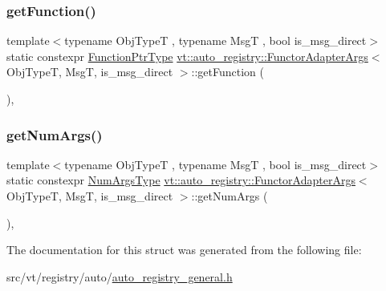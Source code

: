 \subsubsection{\texorpdfstring{get\+Function()}{getFunction()}}
{\footnotesize\ttfamily template$<$typename Obj\+TypeT , typename MsgT , bool is\+\_\+msg\+\_\+direct$>$ \\
static constexpr \hyperlink{structvt_1_1auto__registry_1_1_functor_adapter_args_ae2dba60ea2070d1b36d63bd466abf80e}{Function\+Ptr\+Type} \hyperlink{structvt_1_1auto__registry_1_1_functor_adapter_args}{vt\+::auto\+\_\+registry\+::\+Functor\+Adapter\+Args}$<$ Obj\+TypeT, MsgT, is\+\_\+msg\+\_\+direct $>$\+::get\+Function (\begin{DoxyParamCaption}{ }\end{DoxyParamCaption})\hspace{0.3cm}{\ttfamily [inline]}, {\ttfamily [static]}}

\mbox{\label{structvt_1_1auto__registry_1_1_functor_adapter_args_a41a398d3493eded9ccf9d19013d6e331}} 
\subsubsection{\texorpdfstring{get\+Num\+Args()}{getNumArgs()}}
{\footnotesize\ttfamily template$<$typename Obj\+TypeT , typename MsgT , bool is\+\_\+msg\+\_\+direct$>$ \\
static constexpr \hyperlink{namespacevt_1_1auto__registry_aebda1d9d765bc9147dc654ad0712c936}{Num\+Args\+Type} \hyperlink{structvt_1_1auto__registry_1_1_functor_adapter_args}{vt\+::auto\+\_\+registry\+::\+Functor\+Adapter\+Args}$<$ Obj\+TypeT, MsgT, is\+\_\+msg\+\_\+direct $>$\+::get\+Num\+Args (\begin{DoxyParamCaption}{ }\end{DoxyParamCaption})\hspace{0.3cm}{\ttfamily [inline]}, {\ttfamily [static]}}



The documentation for this struct was generated from the following file\+:\begin{DoxyCompactItemize}
\item 
src/vt/registry/auto/\hyperlink{auto__registry__general_8h}{auto\+\_\+registry\+\_\+general.\+h}\end{DoxyCompactItemize}
